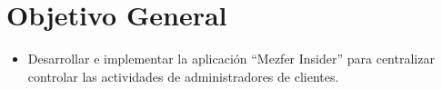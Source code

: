 \section{Objetivo General}
    \begin{itemize}
        \item Desarrollar e implementar la aplicación ``Mezfer Insider'' para centralizar controlar las actividades de administradores de clientes.
    \end{itemize}